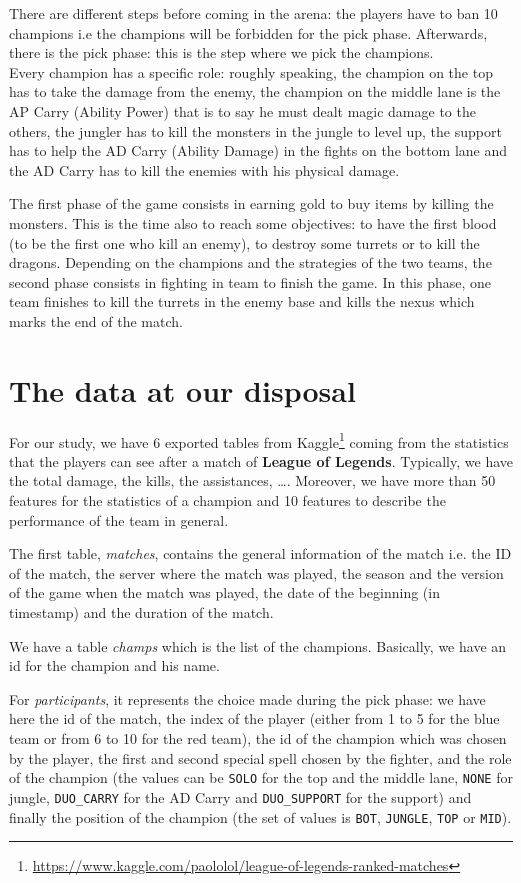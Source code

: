 \documentclass{article}
\def\lol{\textbf{League of Legends}}
\begin{document}
There are different steps before coming in the arena: the players have to ban 10 champions i.e the champions will be forbidden for the pick phase. Afterwards, there is the pick phase: this is the step where we pick the champions.\\ 
Every champion has a specific role: roughly speaking, the champion on the top has to take the damage from the enemy, the champion on the middle lane is the AP Carry (Ability Power) that is to say he must dealt magic damage to the others, the jungler has to kill the monsters in the jungle to level up, the support has to help the AD Carry (Ability Damage) in the fights on the bottom lane and the AD Carry has to kill the enemies with his physical damage. 

The first phase of the game consists in earning gold to buy items by killing the monsters. This is the time also to reach some objectives: to have the first blood (to be the first one who kill an enemy), to destroy some turrets or to kill the dragons. 
Depending on the champions and the strategies of the two teams, the second phase consists in fighting in team to finish the game. In this phase, one team finishes to kill the turrets in the enemy base and kills the nexus which marks the end of the match. 

\section{The data at our disposal}

For our study, we have 6 exported tables from Kaggle\footnote{\url{https://www.kaggle.com/paololol/league-of-legends-ranked-matches}} coming from the statistics that the players can see after a match of \lol. Typically, we have the total damage, the kills, the assistances, \ldots. Moreover, we have more than 50 features for the statistics of a champion and 10 features to describe the performance of the team in general.

The first table, \emph{matches}, contains the general information of the match i.e. the ID of the match, the server where the match was played, the season and the version of the game when the match was played, the date of the beginning (in timestamp) and the duration of the match.

We have a table \emph{champs} which is the list of the champions. Basically, we have an id for the champion and his name. 

For \emph{participants}, it represents the choice made during the pick phase: we have here the id of the match, the index of the player (either from 1 to 5 for the blue team or from 6 to 10 for the red team), the id of the champion which was chosen by the player, the first and second special spell chosen by the fighter, and the role of the champion (the values can be \texttt{SOLO} for the top and the middle lane, \texttt{NONE} for jungle, \texttt{DUO\_CARRY} for the AD Carry and \texttt{DUO\_SUPPORT} for the support) and finally the position of the champion (the set of values is \texttt{BOT}, \texttt{JUNGLE}, \texttt{TOP} or \texttt{MID}).
\end{document}

